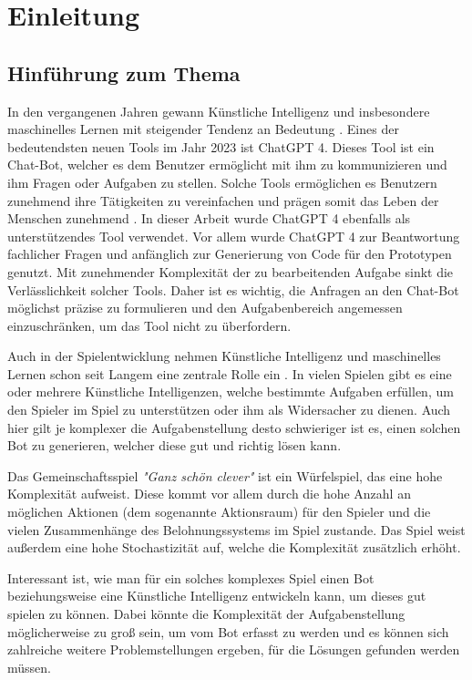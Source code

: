 \section{Einleitung}
\subsection{Hinführung zum Thema}
In den vergangenen Jahren gewann Künstliche Intelligenz und insbesondere maschinelles Lernen mit steigender Tendenz an Bedeutung \cite{statista_aiworldwide}. Eines der bedeutendsten neuen Tools im Jahr 2023 ist ChatGPT 4. Dieses Tool ist ein Chat-Bot, welcher es dem Benutzer ermöglicht mit ihm zu kommunizieren und ihm Fragen oder Aufgaben zu stellen. Solche Tools ermöglichen es Benutzern zunehmend ihre Tätigkeiten zu vereinfachen und prägen somit das Leben der Menschen zunehmend \cite{tagesschaude_chatgpt_nodate}. In dieser Arbeit wurde ChatGPT 4 ebenfalls als unterstützendes Tool verwendet. Vor allem wurde ChatGPT 4 zur Beantwortung fachlicher Fragen und anfänglich zur Generierung von Code für den Prototypen genutzt. Mit zunehmender Komplexität der zu bearbeitenden Aufgabe sinkt die Verlässlichkeit solcher Tools. Daher ist es wichtig, die Anfragen an den Chat-Bot möglichst präzise zu formulieren und den Aufgabenbereich angemessen einzuschränken, um das Tool nicht zu überfordern.

Auch in der Spielentwicklung nehmen Künstliche Intelligenz und maschinelles Lernen schon seit Langem eine zentrale Rolle ein \cite{noauthor_kunstliche_2023,millington_ai_2019}. In vielen Spielen gibt es eine oder mehrere Künstliche Intelligenzen, welche bestimmte Aufgaben erfüllen, um den Spieler im Spiel zu unterstützen oder ihm als Widersacher zu dienen. Auch hier gilt je komplexer die Aufgabenstellung desto schwieriger ist es, einen solchen Bot zu generieren, welcher diese gut und richtig lösen kann.

Das Gemeinschaftsspiel \textit{"Ganz schön clever"} ist ein Würfelspiel, das eine hohe Komplexität aufweist. Diese kommt vor allem durch die hohe Anzahl an möglichen Aktionen (dem sogenannte Aktionsraum) für den Spieler und die vielen Zusammenhänge des Belohnungssystems im Spiel zustande. Das Spiel weist außerdem eine hohe Stochastizität auf, welche die Komplexität zusätzlich erhöht.

Interessant ist, wie man für ein solches komplexes Spiel einen Bot beziehungsweise eine Künstliche Intelligenz entwickeln kann, um dieses gut spielen zu können. Dabei könnte die Komplexität der Aufgabenstellung möglicherweise zu groß sein, um vom Bot erfasst zu werden und es können sich zahlreiche weitere Problemstellungen ergeben, für die Lösungen gefunden werden müssen.
